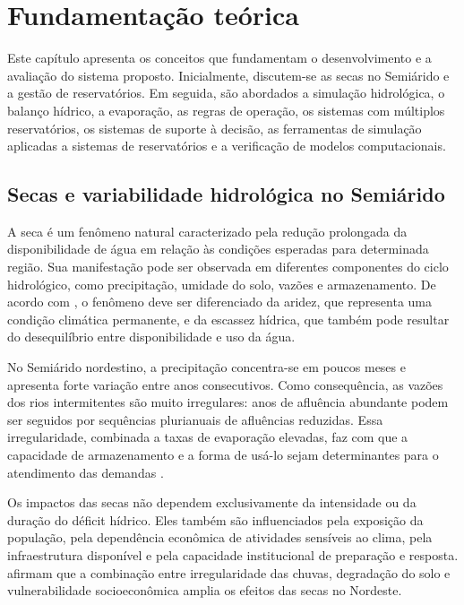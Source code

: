 \chapter{Fundamentação teórica}
\label{cap:fundamentacao-teorica}

Este capítulo apresenta os conceitos que fundamentam o desenvolvimento e a avaliação do sistema proposto. Inicialmente, discutem-se as secas no Semiárido e a gestão de reservatórios. Em seguida, são abordados a simulação hidrológica, o balanço hídrico, a evaporação, as regras de operação, os sistemas com múltiplos reservatórios, os sistemas de suporte à decisão, as ferramentas de simulação aplicadas a sistemas de reservatórios e a verificação de modelos computacionais.

\section{Secas e variabilidade hidrológica no Semiárido}
\label{sec:secas-semiarido}

A seca é um fenômeno natural caracterizado pela redução prolongada da disponibilidade de água em relação às condições esperadas para determinada região. Sua manifestação pode ser observada em diferentes componentes do ciclo hidrológico, como precipitação, umidade do solo, vazões e armazenamento. De acordo com , o fenômeno deve ser diferenciado da aridez, que representa uma condição climática permanente, e da escassez hídrica, que também pode resultar do desequilíbrio entre disponibilidade e uso da água.

No Semiárido nordestino, a precipitação concentra-se em poucos meses e apresenta forte variação entre anos consecutivos. Como consequência, as vazões dos rios intermitentes são muito irregulares: anos de afluência abundante podem ser seguidos por sequências plurianuais de afluências reduzidas. Essa irregularidade, combinada a taxas de evaporação elevadas, faz com que a capacidade de armazenamento e a forma de usá-lo sejam determinantes para o atendimento das demandas \cite{campos2005}.

Os impactos das secas não dependem exclusivamente da intensidade ou da duração do déficit hídrico. Eles também são influenciados pela exposição da população, pela dependência econômica de atividades sensíveis ao clima, pela infraestrutura disponível e pela capacidade institucional de preparação e resposta.  afirmam que a combinação entre irregularidade das chuvas, degradação do solo e vulnerabilidade socioeconômica amplia os efeitos das secas no Nordeste.

